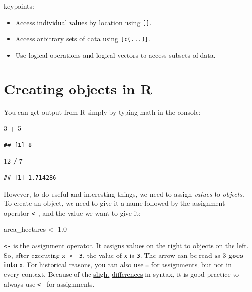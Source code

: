 \documentclass[]{book}
\newenvironment{Shaded}{\begin{snugshade}}{\end{snugshade}}
\newcommand{\DecValTok}[1]{\textcolor[rgb]{0.00,0.00,0.81}{#1}}
\newcommand{\FloatTok}[1]{\textcolor[rgb]{0.00,0.00,0.81}{#1}}
\newcommand{\StringTok}[1]{\textcolor[rgb]{0.31,0.60,0.02}{#1}}
\newcommand{\OperatorTok}[1]{\textcolor[rgb]{0.81,0.36,0.00}{\textbf{#1}}}
\newcommand{\NormalTok}[1]{#1}
\providecommand{\tightlist}{%
  \setlength{\itemsep}{0pt}\setlength{\parskip}{0pt}}
\begin{document}
keypoints:

\begin{itemize}
\tightlist
\item
  Access individual values by location using \texttt{{[}{]}}.\\
\item
  Access arbitrary sets of data using \texttt{{[}c(...){]}}.\\
\item
  Use logical operations and logical vectors to access subsets of data.
\end{itemize}

\section{Creating objects in R}\label{creating-objects-in-r}

You can get output from R simply by typing math in the console:

\begin{Shaded}
\begin{Highlighting}[]
\DecValTok{3} \OperatorTok{+}\StringTok{ }\DecValTok{5}
\end{Highlighting}
\end{Shaded}

\begin{verbatim}
## [1] 8
\end{verbatim}

\begin{Shaded}
\begin{Highlighting}[]
\DecValTok{12} \OperatorTok{/}\StringTok{ }\DecValTok{7}
\end{Highlighting}
\end{Shaded}

\begin{verbatim}
## [1] 1.714286
\end{verbatim}

However, to do useful and interesting things, we need to assign
\emph{values} to \emph{objects}. To create an object, we need to give it
a name followed by the assignment operator \texttt{\textless{}-}, and
the value we want to give it:

\begin{Shaded}
\begin{Highlighting}[]
\NormalTok{area_hectares <-}\StringTok{ }\FloatTok{1.0}
\end{Highlighting}
\end{Shaded}

\texttt{\textless{}-} is the assignment operator. It assigns values on
the right to objects on the left. So, after executing
\texttt{x\ \textless{}-\ 3}, the value of \texttt{x} is \texttt{3}. The
arrow can be read as 3 \textbf{goes into} \texttt{x}. For historical
reasons, you can also use \texttt{=} for assignments, but not in every
context. Because of the
\href{http://blog.revolutionanalytics.com/2008/12/use-equals-or-arrow-for-assignment.html}{slight}
\href{http://r.789695.n4.nabble.com/Is-there-any-difference-between-and-tp878594p878598.html}{differences}
in syntax, it is good practice to always use \texttt{\textless{}-} for
assignments.
\end{document}
